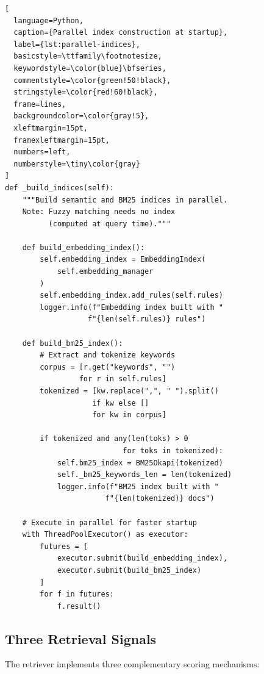 \begin{lstlisting}[
  language=Python, 
  caption={Parallel index construction at startup}, 
  label={lst:parallel-indices},
  basicstyle=\ttfamily\footnotesize,
  keywordstyle=\color{blue}\bfseries,
  commentstyle=\color{green!50!black},
  stringstyle=\color{red!60!black},
  frame=lines,
  backgroundcolor=\color{gray!5},
  xleftmargin=15pt,
  framexleftmargin=15pt,
  numbers=left,
  numberstyle=\tiny\color{gray}
]
def _build_indices(self):
    """Build semantic and BM25 indices in parallel.
    Note: Fuzzy matching needs no index 
          (computed at query time)."""
    
    def build_embedding_index():
        self.embedding_index = EmbeddingIndex(
            self.embedding_manager
        )
        self.embedding_index.add_rules(self.rules)
        logger.info(f"Embedding index built with "
                   f"{len(self.rules)} rules")
    
    def build_bm25_index():
        # Extract and tokenize keywords
        corpus = [r.get("keywords", "") 
                 for r in self.rules]
        tokenized = [kw.replace(",", " ").split() 
                    if kw else [] 
                    for kw in corpus]
        
        if tokenized and any(len(toks) > 0 
                           for toks in tokenized):
            self.bm25_index = BM25Okapi(tokenized)
            self._bm25_keywords_len = len(tokenized)
            logger.info(f"BM25 index built with "
                       f"{len(tokenized)} docs")
    
    # Execute in parallel for faster startup
    with ThreadPoolExecutor() as executor:
        futures = [
            executor.submit(build_embedding_index),
            executor.submit(build_bm25_index)
        ]
        for f in futures:
            f.result()
\end{lstlisting}

\subsection{Three Retrieval Signals}

The retriever implements three complementary scoring mechanisms:

